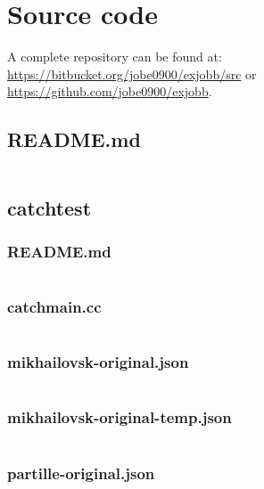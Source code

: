 \documentclass[../main.tex]{subfiles}
\begin{document}
\chapter{Source code}\label{appendix-source-code}
A complete repository can be found at: \\
\url{https://bitbucket.org/jobe0900/exjobb/src} or \\
\url{https://github.com/jobe0900/exjobb}.

\section{README.md}\label{lst:root-readme-md}
\inputminted[breaklines=true]{text}{parts/code/README.md}

\section{catchtest}

\subsection{README.md}\label{lst:catchtest-readme-md}
\inputminted[breaklines=true]{text}{parts/code/catchtest/README.md}

\subsection{catchmain.cc}\label{lst:catchtest-catchmain-cc}
\inputminted[linenos=true]{cpp}{parts/code/catchtest/catchmain.cc}

\subsection{mikhailovsk-original.json}\label{lst:catchtest-testsettings-mikhailovsk-original-json}
\inputminted[linenos=true]{json}{parts/code/catchtest/testsettings/mikhailovsk-original.json}

\subsection{mikhailovsk-original-temp.json}\label{lst:catchtest-testsettings-mikhailovsk-original-temp-json}
\inputminted[linenos=true]{json}{parts/code/catchtest/testsettings/mikhailovsk-original-temp.json}

\subsection{partille-original.json}\label{lst:catchtest-testsettings-partille-original-json}
\inputminted[linenos=true]{json}{parts/code/catchtest/testsettings/partille-original.json}
\end{document}
